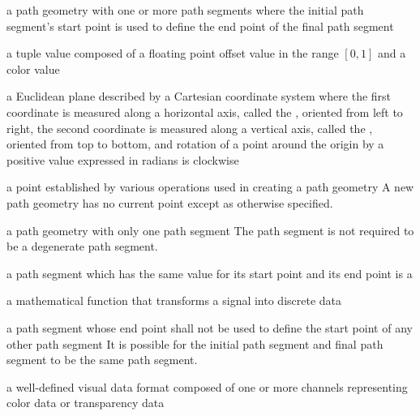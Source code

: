 a path geometry with one or more path segments where the initial path segment's start point is used to define the end point of the final path segment

a tuple value composed of a floating point offset value in the range $[0, 1]$ and a color value

a Euclidean plane described by a Cartesian coordinate system where the first coordinate is measured along a horizontal axis, called the \xaxis, oriented from left to right, the second coordinate is measured along a vertical axis, called the \yaxis, oriented from top to bottom, and rotation of a point around the origin by a positive value expressed in radians is clockwise

a point established by various operations used in creating a path geometry
\enternote
A new path geometry has no current point except as otherwise specified.
\exitnote

a path geometry with only one path segment
\enternote
The path segment is not required to be a degenerate path segment.
\exitnote

a path segment which has the same value for its start point and its end point is a 

a mathematical function that transforms a signal into discrete data

a path segment whose end point shall not be used to define the start point of any other path segment
\enternote
It is possible for the initial path segment and final path segment to be the same path segment.
\exitnote

a well-defined visual data format composed of one or more channels representing 
color data or transparency data

